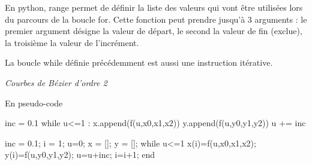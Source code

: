 \documentclass[11pt,oneside]{article}
\begin{document}
\begin{rem}
En python, \textsf{range} permet de définir la liste des valeurs qui vont être utilisées lors du parcours de la boucle \textsf{for}.  Cette fonction peut prendre jusqu'à 3 arguments : le premier argument désigne la valeur de départ, le second la valeur de fin (exclue), la troisième la valeur de l'incrément. 
\end{rem}

\begin{rem}
La boucle \textsf{while} définie précédemment est aussi une instruction itérative. 
\end{rem}


\begin{exemple}
\textit{Courbes de Bézier d'ordre 2}


\begin{pseudo}
En pseudo-code
\end{pseudo}

\begin{py}
\begin{python}
inc = 0.1
while u<=1 :
    x.append(f(u,x0,x1,x2))
    y.append(f(u,y0,y1,y2))
    u += inc
\end{python}
\end{py}

\begin{sci}
\begin{scilab}
inc = 0.1; i = 1;
u=0;
x = []; y = [];
while u<=1
    x(i)=f(u,x0,x1,x2);
    y(i)=f(u,y0,y1,y2);
    u=u+inc;
    i=i+1;
end
\end{scilab}
\end{sci}

\end{exemple}







%
\end{document}
